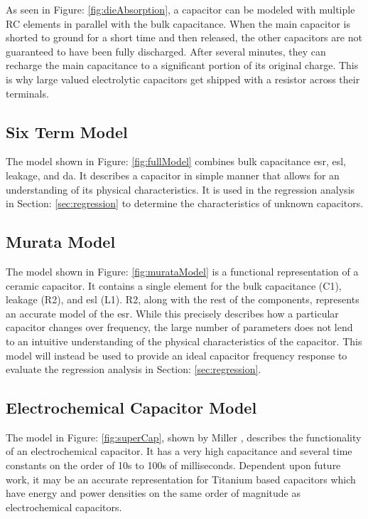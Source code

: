 As seen in Figure: \ref{fig:dieAbsorption}, a capacitor can be modeled with multiple RC elements in parallel with the bulk capacitance. When the main capacitor is shorted to ground for a short time and then released, the other capacitors are not guaranteed to have been fully discharged. After several minutes, they can recharge the main capacitance to a significant portion of its original charge. This is why large valued electrolytic capacitors get shipped with a resistor across their terminals.

\subsection{Six Term Model}


The model shown in Figure: \ref{fig:fullModel} combines bulk capacitance \gls{esr}, \gls{esl}, leakage, and \gls{da}. It describes a capacitor in simple manner that allows for an understanding of its physical characteristics. It is used in the regression analysis in Section: \ref{sec:regression} to determine the characteristics of unknown capacitors.

\subsection{Murata Model}


The model shown in Figure: \ref{fig:murataModel} is a functional representation of a ceramic capacitor. It contains a single element for the bulk capacitance (C1), leakage (R2), and \gls{esl} (L1). R2, along with the rest of the components, represents an accurate model of the \gls{esr}. While this precisely describes how a particular capacitor changes over frequency, the large number of parameters does not lend to an intuitive understanding of the physical characteristics of the capacitor. This model will instead be used to provide an ideal capacitor frequency response to evaluate the regression analysis in Section: \ref{sec:regression}.

\subsection{Electrochemical Capacitor Model}


The model in Figure: \ref{fig:superCap}, shown by Miller \cite{electrochem_intro}, describes the functionality of an electrochemical capacitor. It has a very high capacitance and several time constants on the order of 10s to 100s of milliseconds. Dependent upon future work, it may be an accurate representation for Titanium based capacitors which have energy and power densities on the same order of magnitude as electrochemical capacitors.


